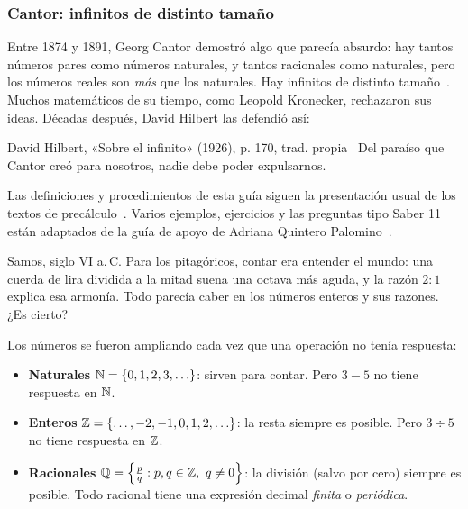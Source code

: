 \documentclass[11pt]{article}
\begin{document}
\subsubsection*{Cantor: infinitos de distinto tamaño}

Entre 1874 y 1891, Georg Cantor demostró algo que parecía absurdo: hay tantos
números pares como números naturales, y tantos racionales como naturales, pero
los números reales son \emph{más} que los naturales. Hay infinitos de distinto
tamaño~\cite{kline}. Muchos matemáticos de su tiempo, como Leopold Kronecker,
rechazaron sus ideas. Décadas después, David Hilbert las defendió así:

\begin{cita}{David Hilbert, «Sobre el infinito» (1926), p. 170, trad. propia~\cite{hilbert}}
Del paraíso que Cantor creó para nosotros, nadie debe poder expulsarnos.
\end{cita}

Las definiciones y procedimientos de esta guía siguen la presentación usual de
los textos de precálculo~\cite{stewart}. Varios ejemplos, ejercicios y las preguntas
tipo Saber 11 están adaptados de la guía de apoyo de Adriana Quintero
Palomino~\cite{quintero}.

\label{tema:sistemas}

\begin{hilo}
Samos, siglo VI a.\,C. Para los pitagóricos, contar era entender el mundo: una
cuerda de lira dividida a la mitad suena una octava más aguda, y la razón $2:1$
explica esa armonía. Todo parecía caber en los números enteros y sus razones.
¿Es cierto?
\end{hilo}

Los números se fueron ampliando cada vez que una operación no tenía respuesta:

\begin{itemize}
  \item \textbf{Naturales} $\mathbb{N} = \{0, 1, 2, 3, \ldots\}$: sirven para contar. Pero
        $3 - 5$ no tiene respuesta en $\mathbb{N}$.
  \item \textbf{Enteros} $\mathbb{Z} = \{\ldots, -2, -1, 0, 1, 2, \ldots\}$: la resta siempre
        es posible. Pero $3 \div 5$ no tiene respuesta en $\mathbb{Z}$.
  \item \textbf{Racionales} $\mathbb{Q} = \left\{ \frac{p}{q} : p, q \in \mathbb{Z},\ q \neq 0 \right\}$:
        la división (salvo por cero) siempre es posible. Todo racional tiene una
        expresión decimal \emph{finita} o \emph{periódica}.
\end{itemize}
\end{document}
